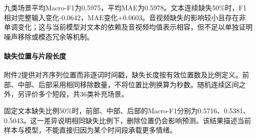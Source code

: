 九类场景平均Macro-F1为0.5975，平均MAE为0.5978。文本连续缺失50\%时，F1相对完整输入变化-0.0642，MAE变化+0.0603。音视频缺失的影响较小且存在非单调变化；这与当前模型对文本的依赖及音视频均值表示相容，但不足以单独证明噪声移除或模态冗余等机制。

\hypertarget{q2-ux7f3aux5931ux4f4dux7f6eux4e0eux7247ux6bb5ux957fux5ea6}{%
\paragraph{缺失位置与片段长度}\label{q2-ux7f3aux5931ux4f4dux7f6eux4e0eux7247ux6bb5ux957fux5ea6}}

附件2提供对齐序列位置而非逐词时间戳，缺失长度按有效位置数及比例定义。前部、中部、后部采用相同移除数量，不将位置比例换算为秒数。随机连续区间之外，另评价多个短段，共36类补充场景。

固定文本缺失比例50\%时，前部、中部、后部的Macro-F1分别为0.5716、0.5381、0.5043。这一差异说明相同缺失比例下，删除位置仍会影响预测。该结果描述当前样本与模型，不能直接归因为某个时间段承载更多情绪。

